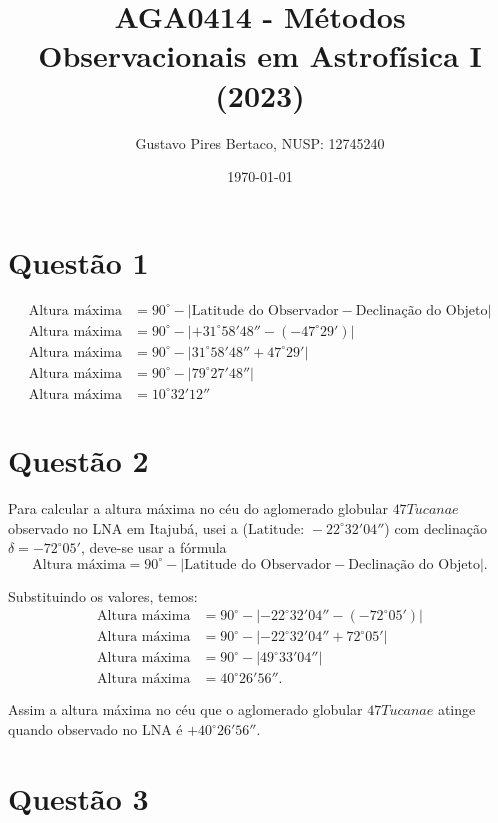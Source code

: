 \documentclass[a4paper, 12pt]{article}
\title{AGA0414 - Métodos Observacionais em Astrofísica I (2023)}
\author{Gustavo Pires Bertaco, NUSP: 12745240}
\date{\today}
\begin{document}
\maketitle

\section*{Questão 1}

\begin{align*}
\text{Altura máxima} &= 90^\circ - \left| \text{Latitude do Observador} - \text{Declinação do Objeto} \right| \\
\text{Altura máxima} &= 90^\circ - \left| +31^\circ 58' 48'' - (-47^\circ 29') \right| \\
\text{Altura máxima} &= 90^\circ - \left| 31^\circ 58' 48'' + 47^\circ 29' \right| \\
\text{Altura máxima} &= 90^\circ - \left| 79^\circ 27' 48'' \right| \\
\text{Altura máxima} &= 10^\circ 32' 12''
\end{align*}

\section*{Questão 2}

Para calcular a altura máxima no céu do aglomerado globular \(47Tucanae\) observado no LNA em Itajubá, usei a  (\(\text{Latitude: } -22^\circ 32' 04''\)) com declinação \(\delta = -72^\circ 05'\), deve-se usar a fórmula 
\[
\text{Altura máxima} = 90^\circ - \left| \text{Latitude do Observador} - \text{Declinação do Objeto} \right|.
\]

Substituindo os valores, temos:
\begin{align*}
\text{Altura máxima} &= 90^\circ - \left| -22^\circ 32' 04'' - (-72^\circ 05') \right| \\
\text{Altura máxima} &= 90^\circ - \left| -22^\circ 32' 04'' + 72^\circ 05' \right| \\
\text{Altura máxima} &= 90^\circ - \left| 49^\circ 33' 04'' \right| \\
\text{Altura máxima} &= 40^\circ 26' 56''.
\end{align*}

Assim a altura máxima no céu que o aglomerado globular \(47Tucanae\) atinge quando observado no LNA é \(+40^\circ 26' 56''\).


\section*{Questão 3}
\end{document}
